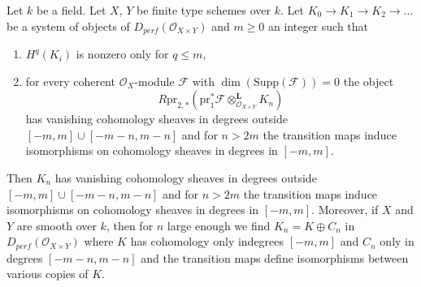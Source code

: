 \begin{lemma}
\label{lemma-bounded-fibres}
Let $k$ be a field. Let $X$, $Y$ be finite type schemes over $k$.
Let $K_0 \to K_1 \to K_2 \to \ldots$ be a system of objects
of $D_{perf}(\mathcal{O}_{X \times Y})$ and $m \geq 0$ an integer such that
\begin{enumerate}
\item $H^q(K_i)$ is nonzero only for $q \leq m$,
\item for every coherent $\mathcal{O}_X$-module $\mathcal{F}$ with
$\dim(\text{Supp}(\mathcal{F})) = 0$ the object
$$
R\text{pr}_{2, *}(
\text{pr}_1^*\mathcal{F} \otimes_{\mathcal{O}_{X \times Y}}^\mathbf{L}
K_n)
$$
has vanishing cohomology sheaves in degrees outside
$[-m, m] \cup [-m - n, m - n]$ and for $n > 2m$ the transition maps
induce isomorphisms on cohomology sheaves in degrees in $[-m, m]$.
\end{enumerate}
Then $K_n$ has vanishing cohomology sheaves in degrees outside
$[-m, m] \cup [-m - n, m - n]$ and for $n > 2m$ the
transition maps induce isomorphisms on cohomology sheaves in degrees in
$[-m, m]$. Moreover, if $X$ and $Y$ are smooth over $k$, then for $n$
large enough we find $K_n = K \oplus C_n$ in
$D_{perf}(\mathcal{O}_{X \times Y})$
where $K$ has cohomology only indegrees $[-m, m]$ and $C_n$ only in
degrees $[-m - n, m - n]$ and the transition maps
define isomorphisms between various copies of $K$.
\end{lemma}

